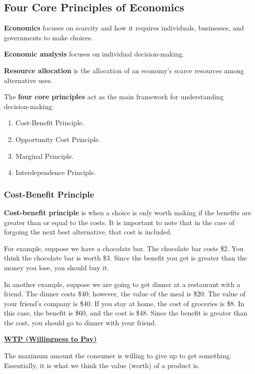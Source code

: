
\subsection{Four Core Principles of Economics}

\textbf{Economics} focuses on scarcity and how it requires individuals, businesses, and governments to make choices.

\textbf{Economic analysis} focuses on individual decision-making.

\textbf{Resource allocation} is the allocation of an economy's scarce resources among alternative uses.

The \textbf{four core principles} act as the main framework for understanding decision-making:
\begin{enumerate}
    \item Cost-Benefit Principle.
    \item Opportunity Cost Principle.
    \item Marginal Principle.
    \item Interdependence Principle.
\end{enumerate}

\subsubsection{Cost-Benefit Principle}

\textbf{Cost-benefit principle} is when a choice is only worth making if the benefits are greater than or equal to the costs. It is important to note that in the case of forgoing the next best alternative, that cost is included.

For example, suppose we have a chocolate bar. The chocolate bar costs \$2. You think the chocolate bar is worth \$3. Since the benefit you get is greater than the money you lose, you should buy it.

In another example, suppose we are going to get dinner at a restaurant with a friend. The dinner costs \$40; however, the value of the meal is \$20. The value of your friend's company is \$40. If you stay at home, the cost of groceries is \$8. In this case, the benefit is \$60, and the cost is \$48. Since the benefit is greater than the cost, you should go to dinner with your friend.

\underline{\textbf{WTP (Willingness to Pay)}}

The maximum amount the consumer is willing to give up to get something. Essentially, it is what we think the value (worth) of a product is.

